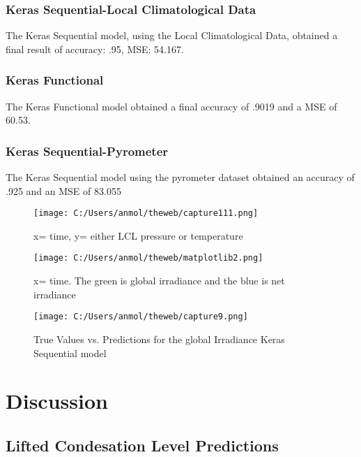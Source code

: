 \documentclass[conference]{IEEEtran}
\begin{document}
\subsubsection{Keras Sequential-Local Climatological Data}
The Keras Sequential model, using the Local Climatological Data, obtained a final result of accuracy: .95, MSE: 54.167. 
\subsubsection{Keras Functional}
The Keras Functional model obtained a final accuracy of .9019 and a MSE of 60.53.
\subsubsection{Keras Sequential-Pyrometer}
The Keras Sequential model using the pyrometer dataset obtained an accuracy of .925 and an MSE of 83.055

\begin{figure}[htbp]
\centerline{\texttt{[image: C:/Users/anmol/theweb/capture111.png]}}
\caption{x= time, y= either LCL pressure or temperature}
\label{fig}
\end{figure}
\begin{figure}[htbp]
\centerline{\texttt{[image: C:/Users/anmol/theweb/matplotlib2.png]}}
\caption{x=  time. The green is global irradiance and the blue is net irradiance}
\label{fig}
\end{figure}
\begin{figure}[htbp]
\centerline{\texttt{[image: C:/Users/anmol/theweb/capture9.png]}}
\caption{True Values vs. Predictions for the global Irradiance Keras Sequential model}
\label{fig}
\end{figure}


\section{Discussion}




\subsection{Lifted Condesation Level Predictions}
\end{document}
